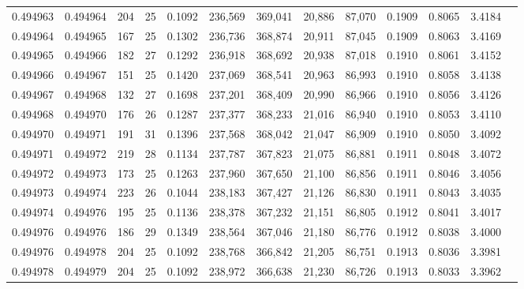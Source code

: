 \begin{tabular}{rrrrrrrrrrrrr}
0.494963 & 0.494964 & 204 &  25 &                                     0.1092 & 236,569 & 369,041 &  20,886 &  87,070 & 0.1909 & 0.8065 & 3.4184 \\
0.494964 & 0.494965 & 167 &  25 &                                     0.1302 & 236,736 & 368,874 &  20,911 &  87,045 & 0.1909 & 0.8063 & 3.4169 \\
0.494965 & 0.494966 & 182 &  27 &                                     0.1292 & 236,918 & 368,692 &  20,938 &  87,018 & 0.1910 & 0.8061 & 3.4152 \\
0.494966 & 0.494967 & 151 &  25 &                                     0.1420 & 237,069 & 368,541 &  20,963 &  86,993 & 0.1910 & 0.8058 & 3.4138 \\
0.494967 & 0.494968 & 132 &  27 &                                     0.1698 & 237,201 & 368,409 &  20,990 &  86,966 & 0.1910 & 0.8056 & 3.4126 \\
0.494968 & 0.494970 & 176 &  26 &                                     0.1287 & 237,377 & 368,233 &  21,016 &  86,940 & 0.1910 & 0.8053 & 3.4110 \\
0.494970 & 0.494971 & 191 &  31 &                                     0.1396 & 237,568 & 368,042 &  21,047 &  86,909 & 0.1910 & 0.8050 & 3.4092 \\
0.494971 & 0.494972 & 219 &  28 &                                     0.1134 & 237,787 & 367,823 &  21,075 &  86,881 & 0.1911 & 0.8048 & 3.4072 \\
0.494972 & 0.494973 & 173 &  25 &                                     0.1263 & 237,960 & 367,650 &  21,100 &  86,856 & 0.1911 & 0.8046 & 3.4056 \\
0.494973 & 0.494974 & 223 &  26 &                                     0.1044 & 238,183 & 367,427 &  21,126 &  86,830 & 0.1911 & 0.8043 & 3.4035 \\
0.494974 & 0.494976 & 195 &  25 &                                     0.1136 & 238,378 & 367,232 &  21,151 &  86,805 & 0.1912 & 0.8041 & 3.4017 \\
0.494976 & 0.494976 & 186 &  29 &                                     0.1349 & 238,564 & 367,046 &  21,180 &  86,776 & 0.1912 & 0.8038 & 3.4000 \\
0.494976 & 0.494978 & 204 &  25 &                                     0.1092 & 238,768 & 366,842 &  21,205 &  86,751 & 0.1913 & 0.8036 & 3.3981 \\
0.494978 & 0.494979 & 204 &  25 &                                     0.1092 & 238,972 & 366,638 &  21,230 &  86,726 & 0.1913 & 0.8033 & 3.3962 \\

\end{tabular}
